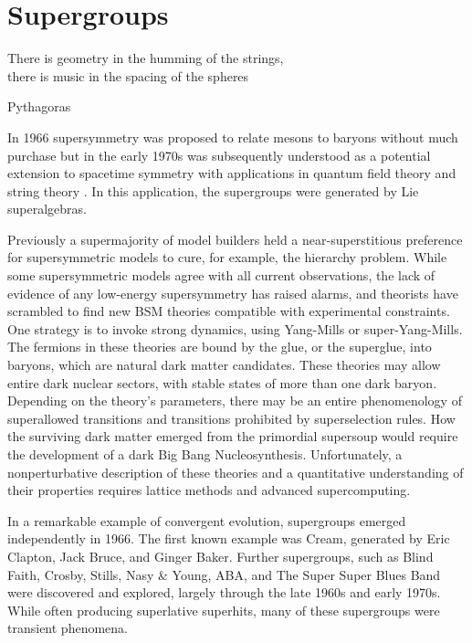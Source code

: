 \section{Supergroups}

\epigraph{There is geometry in the humming of the strings,\\
there is music in the spacing of the spheres}{Pythagoras}


In 1966 supersymmetry was proposed to relate mesons to baryons\cite{doi:10.1143/PTP.36.1266} without much purchase but in the early 1970s was subsequently understood as a potential extension to spacetime symmetry with applications in quantum field theory and string theory \cite{Gervais:1971ji,Ramond:1971gb,Volkov:1973ix,Wess:1974tw}.
In this application, the supergroups were generated by Lie superalgebras.

Previously a supermajority of model builders held a near-superstitious preference for supersymmetric models to cure, for example, the hierarchy problem.
While some supersymmetric models agree with all current observations\cite{fox:2005}, the lack of evidence of any low-energy supersymmetry has raised alarms, and theorists have scrambled to find new BSM theories compatible with experimental constraints.
One strategy is to invoke strong dynamics, using Yang-Mills or super-Yang-Mills.
The fermions in these theories are bound by the glue, or the superglue, into baryons, which are natural dark matter candidates.
These theories may allow entire dark nuclear sectors, with stable states of more than one dark baryon.
Depending on the theory's parameters, there may be an entire phenomenology of superallowed transitions and transitions prohibited by superselection rules.
How the surviving dark matter emerged from the primordial supersoup would require the development of a dark Big Bang Nucleosynthesis.
Unfortunately, a nonperturbative description of these theories and a quantitative understanding of their properties requires lattice methods and advanced supercomputing\cite{Detmold:2014qqa,Detmold:2014kba}.

In a remarkable example of convergent evolution, supergroups emerged independently in 1966.
The first known example was Cream, generated by Eric Clapton, Jack Bruce, and Ginger Baker\cite{supergroups}.
Further supergroups, such as Blind Faith, Crosby, Stills, Nasy \& Young, ABA, and The Super Super Blues Band\cite{supersuperblues} were discovered and explored, largely through the late 1960s and early 1970s.
While often producing superlative superhits, many of these supergroups were transient phenomena.
